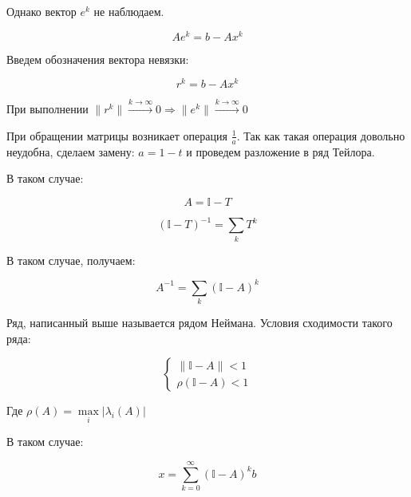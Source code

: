 \documentclass[10pt,a4paper]{article}
\begin{document}
		Однако вектор $e^{k}$ не наблюдаем.
		
		\begin{equation}
			Ae^{k} = b - Ax^{k}
		\end{equation}	
		
		Введем обозначения вектора невязки:
		
		\begin{equation}
			r^{k} = b - Ax^{k}	
		\end{equation}
		
		При выполнении $\parallel r^{k} \parallel
		 \xrightarrow{k \to \infty} 0 \Rightarrow \parallel e^{k} \parallel
		 \xrightarrow{k \to \infty} 0$	
		 
		При обращении матрицы возникает операция $\frac{1}{a}$. Так как такая 
		операция довольно неудобна, сделаем замену: $a = 1 - t$ и проведем 
		разложение в ряд Тейлора.
		
		В таком случае:
		
		\begin{equation}
			A = \mathbb{I} - T
		\end{equation}	
		
		\begin{equation}
			\left(\mathbb{I} - T\right)^{-1} = \sum\limits_{k}T^{k}
		\end{equation}	
		
		В таком случае, получаем:
		
		\begin{equation}
			A^{-1} = \sum\limits_{k}\left(\mathbb{I} - A\right)^{k}	
		\end{equation}		
		
		Ряд, написанный выше называется рядом Неймана. Условия сходимости такого
		ряда:
		
		\begin{equation}
			\begin{cases}
				\parallel \mathbb{I} - A \parallel < 1
				\\
				\rho\left(\mathbb{I} - A \right) < 1
 			\end{cases}	
		\end{equation}	
		
		Где $\rho\left(A\right) = 
		\max\limits_{i}\left|\lambda_{i}\left(A\right)\right|$	
		
		В таком случае:
		
		\begin{equation}
			x = \sum\limits_{k = 0}^{\infty}\left(\mathbb{I} - A\right)^{k}b	
		\end{equation}	
		
\end{document}
